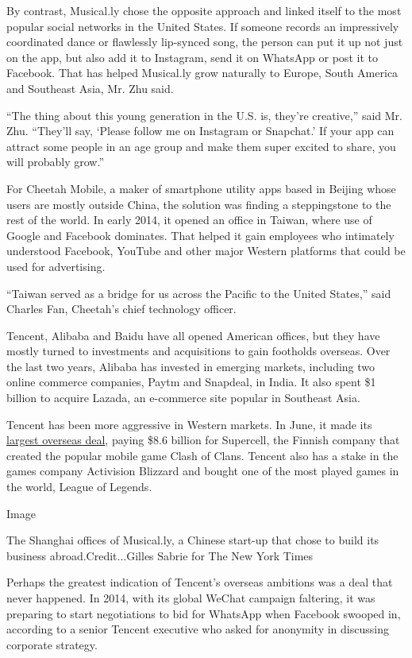 By contrast, Musical.ly chose the opposite approach and linked itself to
the most popular social networks in the United States. If someone
records an impressively coordinated dance or flawlessly lip-synced song,
the person can put it up not just on the app, but also add it to
Instagram, send it on WhatsApp or post it to Facebook. That has helped
Musical.ly grow naturally to Europe, South America and Southeast Asia,
Mr. Zhu said.

``The thing about this young generation in the U.S. is, they're
creative,'' said Mr. Zhu. ``They'll say, `Please follow me on Instagram
or Snapchat.' If your app can attract some people in an age group and
make them super excited to share, you will probably grow.''

For Cheetah Mobile, a maker of smartphone utility apps based in Beijing
whose users are mostly outside China, the solution was finding a
steppingstone to the rest of the world. In early 2014, it opened an
office in Taiwan, where use of Google and Facebook dominates. That
helped it gain employees who intimately understood Facebook, YouTube and
other major Western platforms that could be used for advertising.

``Taiwan served as a bridge for us across the Pacific to the United
States,'' said Charles Fan, Cheetah's chief technology officer.

Tencent, Alibaba and Baidu have all opened American offices, but they
have mostly turned to investments and acquisitions to gain footholds
overseas. Over the last two years, Alibaba has invested in emerging
markets, including two online commerce companies, Paytm and Snapdeal, in
India. It also spent \$1 billion to acquire Lazada, an e-commerce site
popular in Southeast Asia.

Tencent has been more aggressive in Western markets. In June, it made
its
\href{http://www.nytimes.com/2016/06/22/business/dealbook/tencent-softcell-softbank-deal.html}{largest
overseas deal}, paying \$8.6 billion for Supercell, the Finnish company
that created the popular mobile game Clash of Clans. Tencent also has a
stake in the games company Activision Blizzard and bought one of the
most played games in the world, League of Legends.

Image

The Shanghai offices of Musical.ly, a Chinese start-up that chose to
build its business abroad.Credit...Gilles Sabrie for The New York Times

Perhaps the greatest indication of Tencent's overseas ambitions was a
deal that never happened. In 2014, with its global WeChat campaign
faltering, it was preparing to start negotiations to bid for WhatsApp
when Facebook swooped in, according to a senior Tencent executive who
asked for anonymity in discussing corporate strategy.

